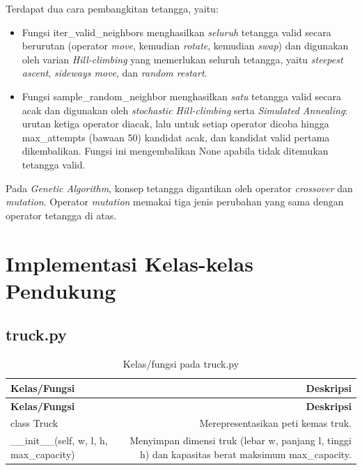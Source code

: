 Terdapat dua cara pembangkitan tetangga, yaitu:
\begin{itemize}
    \item Fungsi iter\_valid\_neighbors menghasilkan \textit{seluruh} tetangga valid secara berurutan (operator \textit{move}, kemudian \textit{rotate}, kemudian \textit{swap}) dan digunakan oleh varian \textit{Hill-climbing} yang memerlukan seluruh tetangga, yaitu \textit{steepest ascent}, \textit{sideways move}, dan \textit{random restart}. 
    \item Fungsi sample\_random\_neighbor menghasilkan \textit{satu} tetangga valid secara acak dan digunakan oleh \textit{stochastic Hill-climbing} serta \textit{Simulated Annealing}: urutan ketiga operator diacak, lalu untuk setiap operator dicoba hingga max\_attempts (bawaan 50) kandidat acak, dan kandidat valid pertama dikembalikan. Fungsi ini mengembalikan None apabila tidak ditemukan tetangga valid.
\end{itemize}

Pada \textit{Genetic Algorithm}, konsep tetangga digantikan oleh operator \textit{crossover} dan \textit{mutation}. Operator \textit{mutation} memakai tiga jenis perubahan yang sama dengan operator tetangga di atas.




\section{Implementasi Kelas-kelas Pendukung}

\subsection{truck.py}

\begin{longtable}{|K|D|}
\caption{Kelas/fungsi pada truck.py}
\label{tab:truck} \\
\hline
\textbf{Kelas/Fungsi} & \textbf{Deskripsi} \\
\hline
\endfirsthead
\hline
\textbf{Kelas/Fungsi} & \textbf{Deskripsi} \\
\hline
\endhead
\hline
\endlastfoot
class Truck & Merepresentasikan peti kemas truk. \\ \hline
\_\_init\_\_(self, w, l, h, max\_capacity) & Menyimpan dimensi truk (lebar w, panjang l, tinggi h) dan kapasitas berat maksimum max\_capacity. \\ \hline
\end{longtable}

